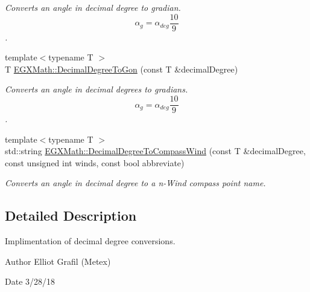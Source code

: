 \begin{DoxyCompactItemize}
\begin{DoxyCompactList}\small\item\em Converts an angle in decimal degree to gradian. \[\alpha_{g}=\alpha_{deg}\frac{10}{9}\]. \end{DoxyCompactList}\item 
{\footnotesize template$<$typename T $>$ }\\T \mbox{\hyperlink{group___e_g_x_math-_conversions-_angle_conversions-_decimal_degree_gaeb333a1ad0aeb913c025fbd1be85fcb3}{E\+G\+X\+Math\+::\+Decimal\+Degree\+To\+Gon}} (const T \&decimal\+Degree)
\begin{DoxyCompactList}\small\item\em Converts an angle in decimal degrees to gradians. \[\alpha_{g}=\alpha_{deg}\frac{10}{9}\]. \end{DoxyCompactList}\item 
{\footnotesize template$<$typename T $>$ }\\std\+::string \mbox{\hyperlink{group___e_g_x_math-_conversions-_angle_conversions-_decimal_degree_ga415a94651a2b2397b7f2bda90a19ee2c}{E\+G\+X\+Math\+::\+Decimal\+Degree\+To\+Compass\+Wind}} (const T \&decimal\+Degree, const unsigned int winds, const bool abbreviate)
\begin{DoxyCompactList}\small\item\em Converts an angle in decimal degree to a n-\/\+Wind compass point name. \end{DoxyCompactList}\end{DoxyCompactItemize}


\subsection{Detailed Description}
Implimentation of decimal degree conversions. 

\begin{DoxyAuthor}{Author}
Elliot Grafil (Metex) 
\end{DoxyAuthor}
\begin{DoxyDate}{Date}
3/28/18 
\end{DoxyDate}
